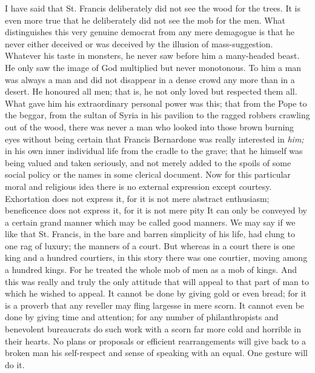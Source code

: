 \documentclass{book}
\begin{document}
I have said that St. Francis deliberately did not see the wood for the trees. It is even more true that he deliberately did not see the mob for the men. What distinguishes this very genuine democrat from any mere demagogue is that he never either deceived or was deceived by the illusion of mass-suggestion. Whatever his taste in monsters, he never saw before him a many-headed beast. He only saw the image of God multiplied but never monotonous. To him a man was always a man and did not disappear in a dense crowd any more than in a desert. He honoured all men; that is, he not only loved but respected them all. What gave him his extraordinary personal power was this; that from the Pope to the beggar, from the sultan of Syria in his pavilion to the ragged robbers crawling out of the wood, there was never a man who looked into those brown burning eyes without being certain that Francis Bernardone was really interested in \emph{him;} in his own inner individual life from the cradle to the grave; that he himself was being valued and taken seriously, and not merely added to the spoils of some social policy or the names in some clerical document. Now for this particular moral and religious idea there is no external expression except courtesy. Exhortation does not express it, for it is not mere abstract enthusiasm; beneficence does not express it, for it is not mere pity It can only be conveyed by a certain grand manner which may be called good manners. We may say if we like that St. Francis, in the bare and barren simplicity of his life, had clung to one rag of luxury; the manners of a court. But whereas in a court there is one king and a hundred courtiers, in this story there was one courtier, moving among a hundred kings. For he treated the whole mob of men as a mob of kings. And this was really and truly the only attitude that will appeal to that part of man to which he wished to appeal. It cannot be done by giving gold or even bread; for it is a proverb that any reveller may fling largesse in mere scorn. It cannot even be done by giving time and attention; for any number of philanthropists and benevolent bureaucrats do such work with a scorn far more cold and horrible in their hearts. No plans or proposals or efficient rearrangements will give back to a broken man his self-respect and sense of speaking with an equal. One gesture will do it.
\end{document}
